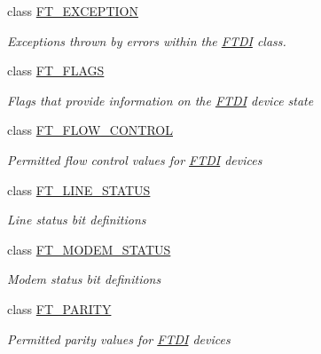 \begin{DoxyCompactItemize}
class \mbox{\hyperlink{class_f_t_d2_x_x___n_e_t_1_1_f_t_d_i_1_1_f_t___e_x_c_e_p_t_i_o_n}{F\+T\+\_\+\+E\+X\+C\+E\+P\+T\+I\+ON}}
\begin{DoxyCompactList}\small\item\em Exceptions thrown by errors within the \mbox{\hyperlink{class_f_t_d2_x_x___n_e_t_1_1_f_t_d_i}{F\+T\+DI}} class. \end{DoxyCompactList}\item 
class \mbox{\hyperlink{class_f_t_d2_x_x___n_e_t_1_1_f_t_d_i_1_1_f_t___f_l_a_g_s}{F\+T\+\_\+\+F\+L\+A\+GS}}
\begin{DoxyCompactList}\small\item\em Flags that provide information on the \mbox{\hyperlink{class_f_t_d2_x_x___n_e_t_1_1_f_t_d_i}{F\+T\+DI}} device state \end{DoxyCompactList}\item 
class \mbox{\hyperlink{class_f_t_d2_x_x___n_e_t_1_1_f_t_d_i_1_1_f_t___f_l_o_w___c_o_n_t_r_o_l}{F\+T\+\_\+\+F\+L\+O\+W\+\_\+\+C\+O\+N\+T\+R\+OL}}
\begin{DoxyCompactList}\small\item\em Permitted flow control values for \mbox{\hyperlink{class_f_t_d2_x_x___n_e_t_1_1_f_t_d_i}{F\+T\+DI}} devices \end{DoxyCompactList}\item 
class \mbox{\hyperlink{class_f_t_d2_x_x___n_e_t_1_1_f_t_d_i_1_1_f_t___l_i_n_e___s_t_a_t_u_s}{F\+T\+\_\+\+L\+I\+N\+E\+\_\+\+S\+T\+A\+T\+US}}
\begin{DoxyCompactList}\small\item\em Line status bit definitions \end{DoxyCompactList}\item 
class \mbox{\hyperlink{class_f_t_d2_x_x___n_e_t_1_1_f_t_d_i_1_1_f_t___m_o_d_e_m___s_t_a_t_u_s}{F\+T\+\_\+\+M\+O\+D\+E\+M\+\_\+\+S\+T\+A\+T\+US}}
\begin{DoxyCompactList}\small\item\em Modem status bit definitions \end{DoxyCompactList}\item 
class \mbox{\hyperlink{class_f_t_d2_x_x___n_e_t_1_1_f_t_d_i_1_1_f_t___p_a_r_i_t_y}{F\+T\+\_\+\+P\+A\+R\+I\+TY}}
\begin{DoxyCompactList}\small\item\em Permitted parity values for \mbox{\hyperlink{class_f_t_d2_x_x___n_e_t_1_1_f_t_d_i}{F\+T\+DI}} devices \end{DoxyCompactList}\item 

\end{DoxyCompactItemize}
